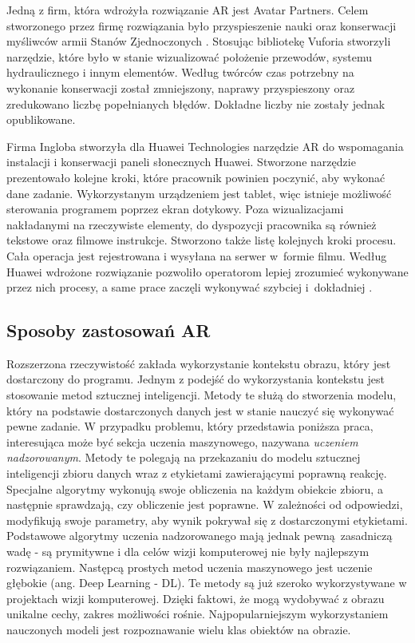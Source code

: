 \documentclass[12pt,twoside,polish]{article}
\begin{document}
Jedną z firm, która wdrożyła rozwiązanie AR jest Avatar Partners. Celem stworzonego przez firmę rozwiązania było przyspieszenie nauki oraz konserwacji myśliwców armii Stanów Zjednoczonych \cite{avatarpartnerscasestudy}. Stosując bibliotekę Vuforia stworzyli narzędzie, które było w stanie wizualizować położenie przewodów, systemu hydraulicznego i innym elementów. Według twórców czas potrzebny na wykonanie konserwacji został zmniejszony, naprawy przyspieszony oraz zredukowano liczbę popełnianych błędów. Dokładne liczby nie zostały jednak opublikowane. 

Firma Ingloba stworzyła dla Huawei Technologies narzędzie AR do wspomagania instalacji i konserwacji paneli słonecznych Huawei. Stworzone narzędzie prezentowało kolejne kroki, które pracownik powinien poczynić, aby wykonać dane zadanie. Wykorzystanym urządzeniem jest tablet, więc istnieje możliwość sterowania programem poprzez ekran dotykowy. Poza wizualizacjami nakładanymi na rzeczywiste elementy, do dyspozycji pracownika są również tekstowe oraz filmowe instrukcje. Stworzono także listę kolejnych kroki procesu. Cała operacja jest rejestrowana i wysyłana na serwer w~formie filmu. Według Huawei wdrożone rozwiązanie pozwoliło  operatorom lepiej zrozumieć wykonywane przez nich procesy, a same prace zaczęli wykonywać szybciej i~dokładniej \cite{huaweicasestudy}.


\subsection {Sposoby zastosowań AR}
Rozszerzona rzeczywistość zakłada wykorzystanie kontekstu obrazu, który jest dostarczony do programu. Jednym z podejść do wykorzystania kontekstu jest stosowanie metod sztucznej inteligencji. Metody te służą do stworzenia modelu, który na podstawie dostarczonych danych jest w stanie nauczyć się wykonywać pewne zadanie. W przypadku problemu, który przedstawia poniższa praca, interesująca może być sekcja uczenia maszynowego, nazywana \emph{uczeniem nadzorowanym}. Metody te polegają na przekazaniu do modelu sztucznej inteligencji zbioru danych wraz z etykietami zawierającymi poprawną reakcję. Specjalne algorytmy wykonują swoje obliczenia na każdym obiekcie zbioru, a następnie sprawdzają, czy obliczenie jest poprawne. W zależności od odpowiedzi, modyfikują swoje parametry, aby wynik pokrywał się z dostarczonymi etykietami. Podstawowe algorytmy uczenia nadzorowanego mają jednak pewną zasadniczą wadę - są prymitywne i dla celów wizji komputerowej nie były najlepszym rozwiązaniem. Następcą prostych metod uczenia maszynowego jest uczenie głębokie (ang. Deep Learning - DL). Te metody są już szeroko wykorzystywane w projektach wizji komputerowej. Dzięki faktowi, że mogą wydobywać z obrazu unikalne cechy, zakres możliwości rośnie. Najpopularniejszym wykorzystaniem nauczonych modeli jest rozpoznawanie wielu klas obiektów na obrazie. \cite{dl_in_cv}
\end{document}

